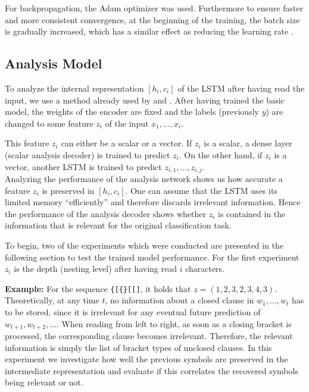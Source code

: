 \documentclass[11pt,a4paper]{article}
\begin{document}
For backpropagation, the Adam \cite{kingma2014adam} optimizer was used. Furthermore to ensure faster and more consistent convergence, at the beginning of the training, the batch size is gradually increased, which has a similar effect as reducing the learning rate \cite{smith2017don}.

\subsection{Analysis Model}

To analyze the internal representation $[h_i, c_i]$ of the LSTM after having read the input, we use a method already used by \citeauthor{shi2016does}  and \citeauthor{belinkov2017neural} . After having trained the basic model, the weights of the encoder are fixed and the labels (previously $y$) are changed to some feature $z_i$ of the input $x_1,\ldots, x_i$.

This feature $z_i$ can either be a scalar or a vector. If $z_i$ is a scalar, a dense layer (scalar analysis decoder) is trained to predict $z_i$. On the other hand, if $z_i$ is a vector, another LSTM is trained to predict $z_{i,1},\ldots,z_{i,j}$.\\

Analyzing the performance of the analysis network shows us how accurate a feature $z_i$ is preserved in $[h_i, c_i]$. One can assume that the LSTM uses its limited memory ``efficiently'' and therefore discards irrelevant information. Hence the performance of the analysis decoder shows whether $z_i$ is contained in the information that is relevant for the original classification task.

To begin, two of the experiments which were conducted are presented in the following section to test the trained model performance. For the first experiment $z_i$ is the depth (nesting level) after having read $i$ characters.

\textbf{Example:} For the sequence \verb|{[{}[[]|, it holds that $z = (1,2,3,2,3,4,3)$.\\

Theoretically, at any time $t$, no information about a closed clause in $w_1,\ldots, w_t$ has to be stored, since it is irrelevant for any eventual future prediction of $w_{t+1}, w_{t+2},\ldots$. 
When reading from left to right, as soon as a closing bracket is processed, the corresponding clause becomes irrelevant. Therefore, the relevant information is simply the list of bracket types of unclosed clauses. In this experiment we investigate how well the previous symbols are preserved in the intermediate representation and evaluate if this correlates the recovered symbols being relevant or not.
\end{document}
